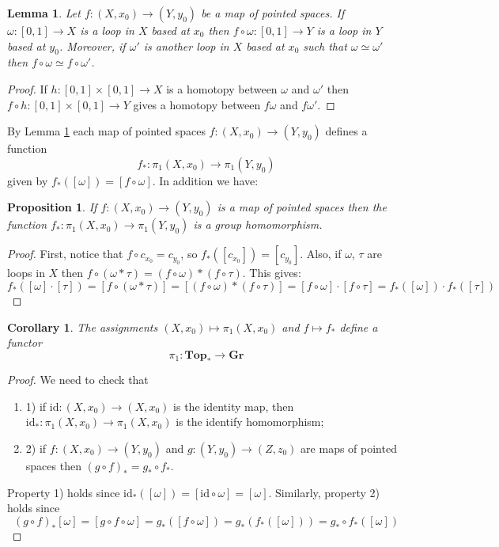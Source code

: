 \documentclass[11pt, letterpaper, oneside]{report}
\theoremstyle{pplain}
\newtheorem{lemma}[theorem]{Lemma}
\newtheorem{proposition}[theorem]{Proposition}
\newtheorem{corollary}[theorem]{Corollary}
\theoremstyle{ddefinition}
\theoremstyle{nnn}
\theoremstyle{eexercise}
\newcommand{\id}{\mathrm{id}}
\newcommand{\Gr}{{\mathbf{Gr}}}
\newcommand{\Top}{{\mathbf{Top}}}
\newcommand{\benu}{\begin{enumerate}}
\newcommand{\eenu}{\end{enumerate}}
\begin{document}
\begin{lemma}
\label{PATH HOMOTOPY IMAGE LEMMA}
Let $f\colon (X, x_{0}) \to (Y, y_{0})$ be a map of pointed spaces. If $\omega\colon [0, 1]\to X$
is a loop in $X$ based at $x_{0}$ then $f\circ \omega\colon [0, 1]\to Y$ is a loop in $Y$ based at $y_{0}$. 
Moreover, if $\omega'$ is another  loop in $X$ based at $x_{0}$ such that $\omega\simeq \omega'$ then 
$f\circ \omega\simeq f\circ \omega'$. 
\end{lemma} 

\begin{proof}
If $h\colon [0,1]\times [0, 1] \to X$ is a homotopy between $\omega$ and $\omega'$ then 
$f\circ h\colon [0, 1]\times [0, 1]\to Y$ gives a homotopy between $f\omega$ and $f\omega'$. 
\end{proof}

By Lemma \ref{PATH HOMOTOPY IMAGE LEMMA}  each map of pointed spaces 
$f\colon (X, x_{0}) \to (Y, y_{0})$ defines a function 
$$f_{\ast}\colon \pi_{1}(X, x_{0}) \to \pi_{1}(Y, y_{0})$$
given by $f_{\ast}([\omega]) = [f\circ \omega]$. In addition we have:

\begin{proposition}
If $f\colon (X, x_{0})\to (Y, y_{0})$ is a map of pointed spaces then the function 
$f_{\ast}\colon \pi_{1}(X, x_{0}) \to \pi_{1}(Y, y_{0})$ is a group homomorphism. 
\end{proposition}


\begin{proof}
First, notice that $f\circ c_{x_{0}} = c_{y_{0}}$, so $f_{\ast}([c_{x_{0}}]) = [c_{y_{0}}]$. 
Also, if $\omega$, $\tau$ are loops in $X$ then 
$f\circ (\omega\ast\tau) = (f\circ\omega)\ast (f\circ \tau)$. This gives:
$$f_{\ast}([\omega]\cdot [\tau]) = [f\circ (\omega\ast\tau)] =  [(f\circ\omega)\ast (f\circ \tau)]
= [f\circ\omega]\cdot [f\circ\tau] = f_{\ast}([\omega])\cdot f_{\ast}([\tau])$$
\end{proof}

\begin{corollary}
The assignments $(X, x_{0})\mapsto \pi_{1}(X, x_{0})$ and $f\mapsto f_{\ast}$ define a functor 
$$\pi_{1}\colon\Top_{\ast} \to \Gr$$
\end{corollary}

\begin{proof}
We need to check that 
\benu
\item[1)] if $\id \colon (X, x_{0}) \to (X, x_{0})$ is the identity map, then 
$\id_{\ast}\colon \pi_{1}(X, x_{0}) \to \pi_{1}(X, x_{0})$
is the identify homomorphism;
\item[2)] if $f\colon (X, x_{0}) \to (Y, y_{0})$ and $g\colon (Y, y_{0}) \to (Z, z_{0})$ are 
maps of pointed spaces then $(g\circ f)_{\ast} = g_{\ast}\circ f_{\ast}$. 
\eenu
Property 1) holds since $\id_{\ast}([\omega]) = [\id \circ \omega] = [\omega]$. Similarly, 
property 2) holds since 
$$(g\circ f)_{\ast}[\omega] = [g\circ f \circ \omega] = g_{\ast}([f\circ \omega]) = g_{\ast}(f_{\ast}([\omega]))
= g_{\ast}\circ f_{\ast}([\omega])$$ 
\end{proof}
\end{document}
